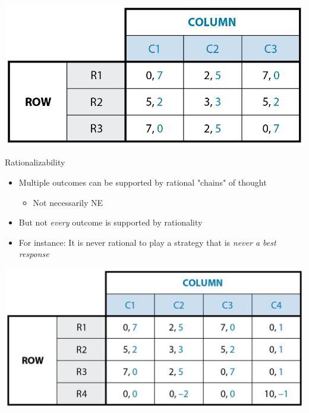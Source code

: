 \documentclass[10pt]{beamer}
\begin{document}
\begin{frame}[label={sec:org6573edd}]{}
\begin{center}
\includegraphics[width=.75\textwidth]{./img/GAMES4_FIG05.05.jpg}
\end{center}
\end{frame}

\begin{frame}[label={sec:orgd141ca3}]{}
\alert{Rationalizability}
\begin{itemize}
\item Multiple outcomes can be supported by rational "chains" of thought
\begin{itemize}
\item Not necessarily NE
\end{itemize}
\item But not \emph{every} outcome is supported by rationality
\item For instance: It is never rational to play a strategy that is \emph{never a best response}
\end{itemize}
\end{frame}

\begin{frame}[label={sec:orgb3faa36}]{}
\begin{center}
\includegraphics[width=.75\textwidth]{./img/GAMES4_FIG05.06.jpg}
\end{center}
\end{frame}
\end{document}
